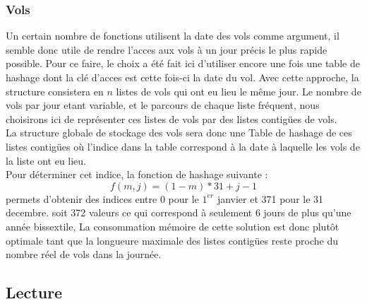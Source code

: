\documentclass[a4paper, 12pt]{article}
\begin{document}
	\subsubsection{Vols}
	Un certain nombre de fonctions utilisent la date des vols comme argument, il semble donc utile de rendre l'acces aux vols à un jour précis le plus rapide possible. Pour ce faire, le choix a été fait ici d'utiliser encore une fois une table de hashage dont la clé d'acces est cette fois-ci la date du vol. Avec cette approche, la structure consistera en $n$ listes de vols qui ont eu lieu le même jour. Le nombre de vols par jour etant variable, et le parcours de chaque liste fréquent, nous choisirons ici de représenter ces listes de vols par des listes contigües de vols.\\
	La structure globale de stockage des vols sera donc une Table de hashage de ces listes contigües où l'indice dans la table correspond à la date à laquelle les vols de la liste ont eu lieu.\\
	Pour déterminer cet indice, la fonction de hashage suivante :\\
	\begin{equation}
		f(m, j) = (1-m)*31 + j -1
	\end{equation}
	permets d'obtenir des indices entre 0 pour le $1^{er}$ janvier et 371 pour le 31 decembre. soit 372 valeurs ce qui correspond à seulement 6 jours de plus qu'une année bissextile, La consommation mémoire de cette solution est donc plutôt optimale tant que la longueure maximale des listes contigües reste proche du nombre réel de vols dans la journée.\\
	
	\subsection{Lecture}
	
	
	
	
	
	
	
	
	
	
\end{document}
